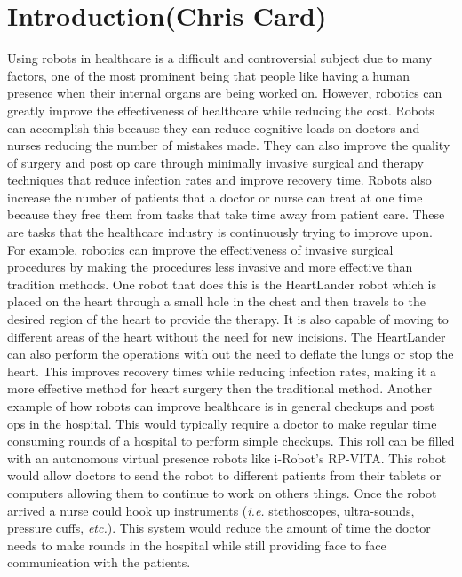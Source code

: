 \documentclass[11pt,conference]{IEEEtran}
\begin{document}
\section{Introduction(Chris Card)}

Using robots in healthcare is a difficult and controversial subject due to many factors, one of the most prominent being that people like having a human presence when their internal organs are being worked on.  However, robotics can greatly improve the effectiveness of healthcare while reducing the cost.  Robots can accomplish this because they can reduce cognitive loads on doctors and nurses reducing the number of 
mistakes made.  They can also improve the quality of surgery and post op care through minimally invasive surgical and therapy techniques that reduce infection rates and improve recovery time.  Robots also increase the number of patients that a doctor or nurse can treat at one time because they free them from tasks that take time away from patient care.  These are tasks that the healthcare industry is continuously trying to improve upon.
\newline
\indent For example, robotics can improve the effectiveness of invasive surgical procedures by making the procedures less invasive and more effective than tradition methods.  One robot that does this is the HeartLander robot which is placed on the heart through a small hole in 
the chest and then travels to the desired region of the heart to provide the therapy. It is also capable of moving to different areas of the heart without the need for new incisions.  The HeartLander can also perform the 
operations with out the need to deflate the lungs or stop the heart.  This improves recovery times while reducing infection rates, making it a more effective method for heart surgery then the traditional method.  
\newline
\indent Another example of how robots can improve healthcare is in general checkups and post ops in the hospital.  This would typically require a doctor to make regular time consuming rounds of a hospital to perform simple checkups.  This roll can be filled with an autonomous virtual presence robots like i-Robot's RP-VITA.  This robot would allow doctors to send the robot to different patients from their tablets or computers allowing them to continue to work on others things.  Once the robot arrived a nurse could hook up instruments (\textit{i.e.} stethoscopes, ultra-sounds, pressure cuffs, \textit{etc.}).  This system would reduce the amount of time the doctor needs to make rounds in the hospital while still providing face to face communication with the patients.
\end{document}
